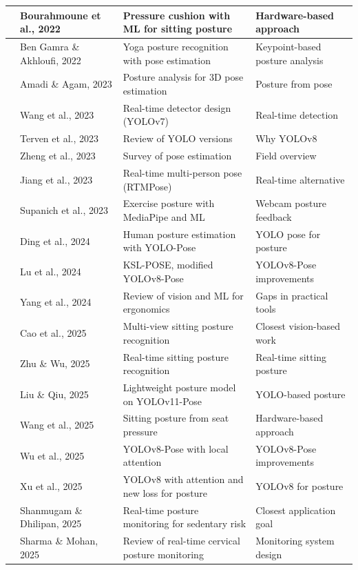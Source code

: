 ﻿\documentclass[12pt,a4paper]{article}
\begin{document}
\begin{longtable}{|p{0.9cm}|p{3.0cm}|p{5.4cm}|p{4.2cm}|}
\cite{bourahmoune2022cushion} & Bourahmoune et al., 2022 & Pressure cushion with ML for sitting posture & Hardware-based approach\\ \hline
\cite{gamra2022yopose} & Ben Gamra \& Akhloufi, 2022 & Yoga posture recognition with pose estimation & Keypoint-based posture analysis\\ \hline
\cite{amadi2023postureposE} & Amadi \& Agam, 2023 & Posture analysis for 3D pose estimation & Posture from pose\\ \hline
\cite{wang2023yolov7} & Wang et al., 2023 & Real-time detector design (YOLOv7) & Real-time detection\\ \hline
\cite{terven2023yolo} & Terven et al., 2023 & Review of YOLO versions & Why YOLOv8\\ \hline
\cite{zheng2023survey} & Zheng et al., 2023 & Survey of pose estimation & Field overview\\ \hline
\cite{jiang2023rtmpose} & Jiang et al., 2023 & Real-time multi-person pose (RTMPose) & Real-time alternative\\ \hline
\cite{supanich2023mediapipe} & Supanich et al., 2023 & Exercise posture with MediaPipe and ML & Webcam posture feedback\\ \hline
\cite{ding2024yolopose} & Ding et al., 2024 & Human posture estimation with YOLO-Pose & YOLO pose for posture\\ \hline
\cite{lu2024ksl} & Lu et al., 2024 & KSL-POSE, modified YOLOv8-Pose & YOLOv8-Pose improvements\\ \hline
\cite{yang2024review} & Yang et al., 2024 & Review of vision and ML for ergonomics & Gaps in practical tools\\ \hline
\cite{cao2025keypointnet} & Cao et al., 2025 & Multi-view sitting posture recognition & Closest vision-based work\\ \hline
\cite{zhu2025rtmposelrf} & Zhu \& Wu, 2025 & Real-time sitting posture recognition & Real-time sitting posture\\ \hline
\cite{liu2025yolov11} & Liu \& Qiu, 2025 & Lightweight posture model on YOLOv11-Pose & YOLO-based posture\\ \hline
\cite{wang2025pressure} & Wang et al., 2025 & Sitting posture from seat pressure & Hardware-based approach\\ \hline
\cite{wu2025badminton} & Wu et al., 2025 & YOLOv8-Pose with local attention & YOLOv8-Pose improvements\\ \hline
\cite{xu2025simdlka} & Xu et al., 2025 & YOLOv8 with attention and new loss for posture & YOLOv8 for posture\\ \hline
\cite{shanmugam2025sedentary} & Shanmugam \& Dhilipan, 2025 & Real-time posture monitoring for sedentary risk & Closest application goal\\ \hline
\cite{sharma2025cervical} & Sharma \& Mohan, 2025 & Review of real-time cervical posture monitoring & Monitoring system design\\ \hline
\end{longtable}
\endgroup
\end{document}
